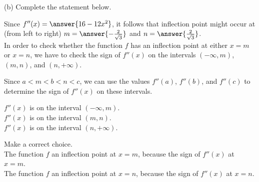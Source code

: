 \documentclass{ximera}
\begin{document}
\begin{exercise}
\begin{exercise}
\begin{exercise}
\begin{exercise}
\begin{exercise}
(b) Complete the statement below.
\begin{exercise}

Since $f''(x)=\answer{16-12x^2}$, it follows that inflection point might occur at  (from left to right) $m=\answer{-\frac{2}{\sqrt{3}}}$ and $n=\answer{\frac{2}{\sqrt{3}}}$.\\

In order to check whether the function $f$ has an inflection point at either $x=m$ or $x=n$, we have to check the sign of $f''(x)$ on the intervals $(-\infty,m)$, $(m,n)$, and $(n,+\infty)$.

Since $a < m < b < n < c$, we can use the values $f''(a)$, $f''(b)$, and $f''(c)$ to determine the sign of $f''(x)$ on these intervals.
\begin{exercise}


 $f''(x)$ is  on the interval $(-\infty,m)$.\\
 
  $f''(x)$ is  on the interval $(m,n)$.\\
  
    $f''(x)$ is  on the interval  $(n,+\infty)$.\\
  \begin{exercise}
 Make a correct choice.\\
 
  The function $f$  an inflection point at $x=m$, because the sign of $f''(x)$  at $x=m$.\\
  The function $f$  an inflection point at $x=n$, because the sign of $f''(x)$  at $x=n$.\\
 
  \end{exercise}
 \end{exercise}
\end{exercise}
\end{exercise}
\end{exercise}
\end{exercise}
\end{exercise}
\end{exercise}
\end{document}
